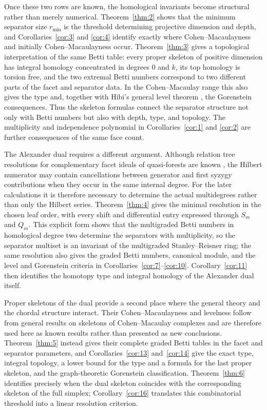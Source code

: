 \documentclass[11pt]{amsart}
\theoremstyle{definition}
\theoremstyle{remark}
\begin{document}
	Once these two rows are known, the homological invariants become structural rather than merely numerical. Theorem~\ref{thm:2} shows that the minimum separator size $r_{\min}$ is the threshold determining projective dimension and depth, and Corollaries~\ref{cor:3} and \ref{cor:4} identify exactly where Cohen--Macaulayness and initially Cohen--Macaulayness occur. Theorem~\ref{thm:3} gives a topological interpretation of the same Betti table: every proper skeleton of positive dimension has integral homology concentrated in degrees $0$ and $k$, its top homology is torsion free, and the two extremal Betti numbers correspond to two different parts of the facet and separator data. In the Cohen--Macaulay range this also gives the type and, together with Hibi's general level theorem \cite{HerzogHibi99,HibiLevel}, the Gorenstein consequences. Thus the skeleton formulas connect the separator structure not only with Betti numbers but also with depth, type, and topology. The multiplicity and independence polynomial in Corollaries~\ref{cor:1} and \ref{cor:2} are further consequences of the same face count.
	
	The Alexander dual requires a different argument. Although relation tree resolutions for complementary facet ideals of quasi-forests are known \cite{FaridiHersey,HHZ04}, the Hilbert numerator may contain cancellations between generator and first syzygy contributions when they occur in the same internal degree. For the later calculations it is therefore necessary to determine the actual multidegrees rather than only the Hilbert series. Theorem~\ref{thm:4} gives the minimal resolution in the chosen leaf order, with every shift and differential entry expressed through $S_m$ and $Q_m$. This explicit form shows that the multigraded Betti numbers in homological degree two determine the separators with multiplicity, so the separator multiset is an invariant of the multigraded Stanley--Reisner ring; the same resolution also gives the graded Betti numbers, canonical module, and the level and Gorenstein criteria in Corollaries~\ref{cor:7}--\ref{cor:10}. Corollary~\ref{cor:11} then identifies the homotopy type and integral homology of the Alexander dual itself.
	
	Proper skeletons of the dual provide a second place where the general theory and the chordal structure interact. Their Cohen--Macaulayness and levelness follow from general results on skeletons of Cohen--Macaulay complexes and are therefore used here as known results rather than presented as new conclusions. Theorem~\ref{thm:5} instead gives their complete graded Betti tables in the facet and separator parameters, and Corollaries~\ref{cor:13} and~\ref{cor:14} give the exact type, integral topology, a lower bound for the type and a formula for the last proper skeleton, and the graph-theoretic Gorenstein classification. Theorem~\ref{thm:6} identifies precisely when the dual skeleton coincides with the corresponding skeleton of the full simplex; Corollary~\ref{cor:16} translates this combinatorial threshold into a linear resolution criterion.
	
\end{document}
